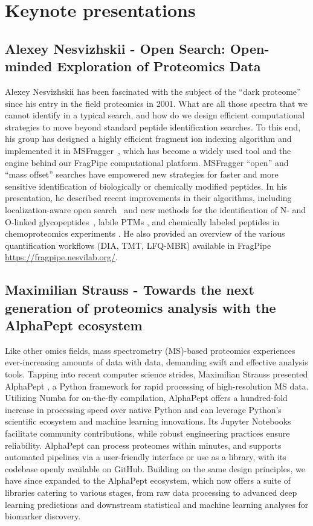 \section{Keynote presentations}

\subsection{Alexey Nesvizhskii - Open Search: Open-minded Exploration of Proteomics Data}

Alexey Nesvizhskii  has been fascinated with the subject of the ``dark proteome'' since his entry in the field proteomics in 2001. What are all those spectra that we cannot identify in a typical search, and how do we design efficient computational strategies to move beyond standard peptide identification searches.  To this end, his group has designed a highly efficient fragment ion indexing algorithm and implemented it in MSFragger~\citep{pmid28394336}, which has become a widely used tool and the engine behind our FragPipe computational platform. MSFragger ``open'' and ``mass offset'' searches have empowered new strategies for faster and more sensitive identification of biologically or chemically modified peptides. In his presentation, he described recent improvements in their algorithms, including localization-aware open search~\citep{pmid32792501} and new methods for the identification of N- and O-linked glycopeptides~\citep{pmid33020657}, labile PTMs \citep{pmid37004988}, and chemically labeled peptides in chemoproteomics experiments \citep{pmid37438360}. He  also provided an overview of the various quantification workflows (DIA, TMT, LFQ-MBR) available in FragPipe \url{https://fragpipe.nesvilab.org/}.


\subsection{Maximilian Strauss - Towards the next generation of proteomics analysis with the AlphaPept ecosystem}

Like other omics fields, mass spectrometry (MS)-based proteomics experiences ever-increasing amounts of data with data, demanding swift and effective analysis tools. Tapping into recent computer science strides, Maximilian Strauss presented AlphaPept \citep{Strauss2024}, a Python framework for rapid processing of high-resolution MS data. Utilizing Numba for on-the-fly compilation, AlphaPept offers a hundred-fold increase in processing speed over native Python and can leverage Python's scientific ecosystem and machine learning innovations. Its Jupyter Notebooks facilitate community contributions, while robust engineering practices ensure reliability. AlphaPept can process proteomes within minutes, and supports automated pipelines via a user-friendly interface or use as a library, with its codebase openly available on GitHub. Building on the same design principles, we have since expanded to the AlphaPept ecosystem, which now offers a suite of libraries catering to various stages, from raw data processing to advanced deep learning predictions and downstream statistical and machine learning analyses for biomarker discovery.

